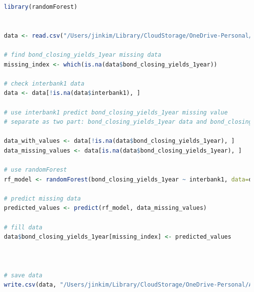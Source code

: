 \documentclass[10pt]{article}
\begin{document}
\begin{lstlisting}[language=R]
library(randomForest)


data <- read.csv("/Users/jinkim/Library/CloudStorage/OneDrive-Personal/Aucklanduni/2023 S2/ECON 723/Group Project/interbank.csv")

# find bond_closing_yields_1year missing data
missing_index <- which(is.na(data$bond_closing_yields_1year))

# check interbank1 data
data <- data[!is.na(data$interbank1), ]

# use interbank1 predict bond_closing_yields_1year missing value
# separate as two part: bond_closing_yields_1year data and bond_closing_yields_1year missing data

data_with_values <- data[!is.na(data$bond_closing_yields_1year), ]
data_missing_values <- data[is.na(data$bond_closing_yields_1year), ]

# use randomForest
rf_model <- randomForest(bond_closing_yields_1year ~ interbank1, data=data_with_values, ntree=10000)

# predict missing data
predicted_values <- predict(rf_model, data_missing_values)

# fill data
data$bond_closing_yields_1year[missing_index] <- predicted_values



# save data
write.csv(data, "/Users/jinkim/Library/CloudStorage/OneDrive-Personal/Aucklanduni/2023 S2/ECON 723/Group Project/nz.csv", row.names=FALSE)

\end{lstlisting}
\end{document}
